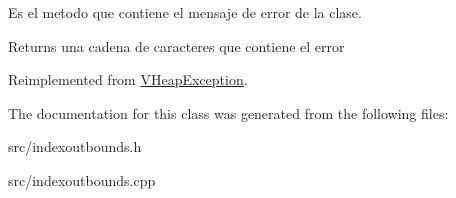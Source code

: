 Es el metodo que contiene el mensaje de error de la clase. 

\begin{DoxyReturn}{Returns}
una cadena de caracteres que contiene el error 
\end{DoxyReturn}


Reimplemented from \hyperlink{class_v_heap_exception_a58154e8dc02f9c28dfefad7897f8b2cf}{V\-Heap\-Exception}.



The documentation for this class was generated from the following files\-:\begin{DoxyCompactItemize}
\item 
src/indexoutbounds.\-h\item 
src/indexoutbounds.\-cpp\end{DoxyCompactItemize}
